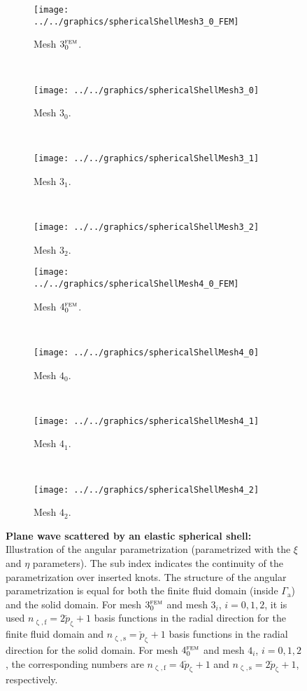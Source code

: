 \begin{figure}
	\centering        
	\begin{subfigure}{0.23\textwidth}
		\centering
		\texttt{[image: ../../graphics/sphericalShellMesh3\_0\_FEM]}
		\caption{Mesh $3_0^{\textsc{fem}}$.}
		\label{Fig2:SphericalShellMesh3_0_FEM}
	\end{subfigure}
	~
	\begin{subfigure}{0.23\textwidth}
		\centering
		\texttt{[image: ../../graphics/sphericalShellMesh3\_0]}
		\caption{Mesh $3_0$.}
		\label{Fig2:SphericalShellMesh3_0_FSI}
	\end{subfigure}
	~
	\begin{subfigure}{0.23\textwidth}
		\centering
		\texttt{[image: ../../graphics/sphericalShellMesh3\_1]}
		\caption{Mesh $3_1$.}
		\label{Fig2:SphericalShellMesh3_1_FSI}
	\end{subfigure}
	~
	\begin{subfigure}{0.23\textwidth}
		\centering
		\texttt{[image: ../../graphics/sphericalShellMesh3\_2]}
		\caption{Mesh $3_2$.}
		\label{Fig2:SphericalShellMesh3_2_FSI}
	\end{subfigure}
	\par\bigskip  
	\begin{subfigure}{0.23\textwidth}
		\centering
		\texttt{[image: ../../graphics/sphericalShellMesh4\_0\_FEM]}
		\caption{Mesh $4_0^{\textsc{fem}}$.}
		\label{Fig2:SphericalShellMesh4_0_FEM}
	\end{subfigure}
	~
	\begin{subfigure}{0.23\textwidth}
		\centering
		\texttt{[image: ../../graphics/sphericalShellMesh4\_0]}
		\caption{Mesh $4_0$.}
		\label{Fig2:SphericalShellMesh4_0_FSI}
	\end{subfigure}
	~
	\begin{subfigure}{0.23\textwidth}
		\centering
		\texttt{[image: ../../graphics/sphericalShellMesh4\_1]}
		\caption{Mesh $4_1$.}
		\label{Fig2:SphericalShellMesh4_1_FSI}
	\end{subfigure}
	~
	\begin{subfigure}{0.23\textwidth}
		\centering
		\texttt{[image: ../../graphics/sphericalShellMesh4\_2]}
		\caption{Mesh $4_2$.}
		\label{Fig2:SphericalShellMesh4_2_FSI}
	\end{subfigure}
	\caption{\textbf{Plane wave scattered by an elastic spherical shell:} Illustration of the angular parametrization (parametrized with the $\xi$ and $\eta$ parameters). The sub index indicates the continuity of the parametrization over inserted knots. The structure of the angular parametrization is equal for both the finite fluid domain (inside $\Gamma_{\mathrm{a}}$) and the solid domain. For mesh $3_0^{\textsc{fem}}$ and mesh $3_i$, $i=0,1,2$, it is used $n_{\upzeta, \mathrm{f}}=2\check{p}_\upzeta+1$ basis functions in the radial direction for the finite fluid domain and $n_{\upzeta, \mathrm{s}}=\check{p}_\upzeta+1$ basis functions in the radial direction for the solid domain. For mesh $4_0^{\textsc{fem}}$ and mesh $4_i$, $i=0,1,2$, the corresponding numbers are $n_{\upzeta, \mathrm{f}}=4\check{p}_\upzeta+1$ and $n_{\upzeta, \mathrm{s}}=2\check{p}_\upzeta+1$, respectively.}

\end{figure}
